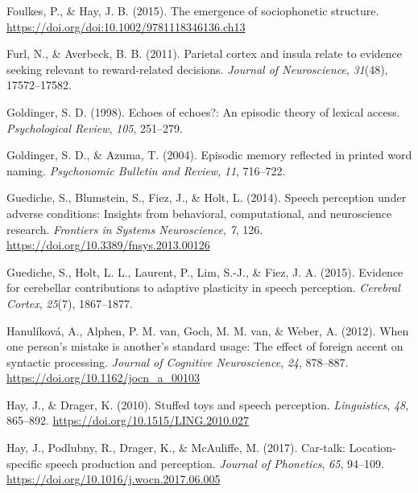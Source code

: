 \documentclass[
  11pt,
  english,
  man,floatsintext]{apa6}
\newlength{\cslhangindent}
\newlength{\cslentryspacingunit} %
\newenvironment{CSLReferences}[2] %
 {%
  \setlength{\parindent}{0pt}
  \ifodd #1
  \let\oldpar\par
  \def\par{\hangindent=\cslhangindent\oldpar}
  \fi
  \setlength{\parskip}{#2\cslentryspacingunit}
 }%
 {}
\begin{document}
\begin{CSLReferences}{1}{0}
\leavevmode{}%
Foulkes, P., \& Hay, J. B. (2015). The emergence of sociophonetic structure. \url{https://doi.org/doi:10.1002/9781118346136.ch13}

\leavevmode{}%
Furl, N., \& Averbeck, B. B. (2011). Parietal cortex and insula relate to evidence seeking relevant to reward-related decisions. \emph{Journal of Neuroscience}, \emph{31}(48), 17572--17582.

\leavevmode{}%
Goldinger, S. D. (1998). Echoes of echoes?: An episodic theory of lexical access. \emph{Psychological Review}, \emph{105}, 251--279.

\leavevmode{}%
Goldinger, S. D., \& Azuma, T. (2004). Episodic memory reflected in printed word naming. \emph{Psychonomic Bulletin and Review}, \emph{11}, 716--722.

\leavevmode{}%
Guediche, S., Blumstein, S., Fiez, J., \& Holt, L. (2014). Speech perception under adverse conditions: Insights from behavioral, computational, and neuroscience research. \emph{Frontiers in Systems Neuroscience}, \emph{7}, 126. \url{https://doi.org/10.3389/fnsys.2013.00126}

\leavevmode{}%
Guediche, S., Holt, L. L., Laurent, P., Lim, S.-J., \& Fiez, J. A. (2015). Evidence for cerebellar contributions to adaptive plasticity in speech perception. \emph{Cerebral Cortex}, \emph{25}(7), 1867--1877.

\leavevmode{}%
Hanulíková, A., Alphen, P. M. van, Goch, M. M. van, \& Weber, A. (2012). When one person's mistake is another's standard usage: The effect of foreign accent on syntactic processing. \emph{Journal of Cognitive Neuroscience}, \emph{24}, 878--887. \url{https://doi.org/10.1162/jocn_a_00103}

\leavevmode{}%
Hay, J., \& Drager, K. (2010). Stuffed toys and speech perception. \emph{Linguistics}, \emph{48}, 865--892. \url{https://doi.org/10.1515/LING.2010.027}

\leavevmode{}%
Hay, J., Podlubny, R., Drager, K., \& McAuliffe, M. (2017). Car-talk: Location-specific speech production and perception. \emph{Journal of Phonetics}, \emph{65}, 94--109. \url{https://doi.org/10.1016/j.wocn.2017.06.005}


\end{CSLReferences}
\end{document}
